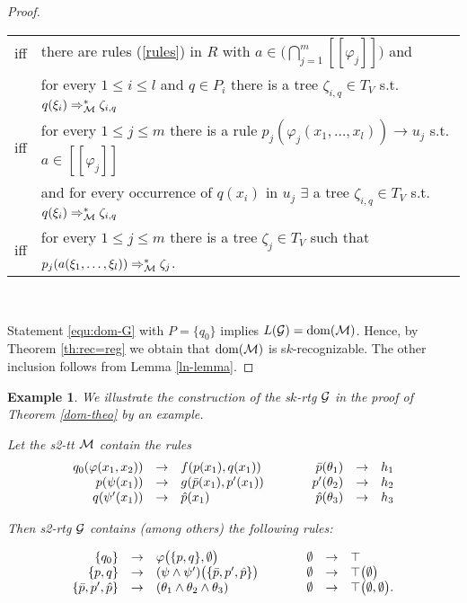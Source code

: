 \documentclass[10pt]{scrartcl}
\newtheorem{ex}[df]{Example}
\newcommand{\seml}{[\![}
\newcommand{\semr}{]\!]}
\newcommand{\M}{{\cal M}}
\newcommand{\G}{{\cal G}}
\DeclareMathOperator{\dom}{dom}
\begin{document}
\begin{proof}
\begin{tabular}{cl}
iff & there are rules (\ref{rules}) in $R$ with $a\in \big(\bigcap_{j=1}^m\seml \varphi_j\semr\big)$ and\\[1mm]

&  for every $1\le i\le l$ and $q\in P_i$ there is a tree $\zeta_{i,q} \in T_V$ s.t. $q(\xi_i)
\Rightarrow_\M^* \zeta_{i,q}$\\[3mm]

iff & for every $1\le j\le m$  there is a rule $p_j(\varphi_j(x_1,\ldots,x_l)) \rightarrow u_j$ s.t. $a\in \seml \varphi_j\semr$ \\[1mm]

& and  for every occurrence of $q(x_i)$ in $u_j$ $\exists$ a tree $\zeta_{i,q} \in T_V$ s.t. $q(\xi_i)
\Rightarrow_\M^* \zeta_{i,q}$\\[3mm]

iff & for every $1\le j\le m$ there is  a tree $\zeta_{j} \in T_V$ such that $p_j(a(\xi_1,\ldots,\xi_l))
\Rightarrow_\M^* \zeta_{j}$.
\end{tabular}


\

\noindent Statement \eqref{equ:dom-G} with $P=\{q_0\}$ implies  $L(\G) = \dom(\M)$. Hence, by Theorem \ref{th:rec=reg} we obtain that $\dom(\M)$ is s$k$-recognizable.
The other inclusion follows from Lemma \ref{ln-lemma}.
\end{proof}

\begin{ex}\rm We illustrate the construction of the s$k$-rtg $\G$ in the proof
  of Theorem \ref{dom-theo} by an example. 

Let the s2-tt $\M$ contain the rules
\[
\begin{array}{rclrcl}
q_0(\varphi(x_1,x_2)) & \rightarrow & f(p(x_1),q(x_1)) \hspace{10mm} &
\bar{p}(\theta_1) & \rightarrow & h_1\\
p(\psi(x_1)) & \rightarrow & g(\bar{p}(x_1),p'(x_1)) \hspace{10mm} &
p'(\theta_2) & \rightarrow & h_2\\
q(\psi'(x_1)) & \rightarrow & \hat{p}(x_1) \hspace{10mm} &
\hat{p}(\theta_3) & \rightarrow & h_3\\
\end{array}
\]

Then s2-rtg $\G$ contains (among others) the following rules:

\[
\begin{array}{rclrcl}
\{q_0\} &\rightarrow& \varphi\big(\{p,q\}, \emptyset
\big) \hspace{10mm}&
\emptyset&\rightarrow& \top\\
\{p,q\} &\rightarrow& (\psi \wedge
\psi')\big(\{\bar{p},p',\hat{p}\}\big) \hspace{10mm}&
\emptyset&\rightarrow& \top\big(\emptyset \big) \\
\{\bar{p},p',\hat{p}\} &\rightarrow& (\theta_1 \wedge \theta_2
\wedge \theta_3) \hspace{10mm}&
\emptyset&\rightarrow& \top\big(\emptyset,\emptyset\big).
\end{array} 
\]
\end{ex}
\end{document}
